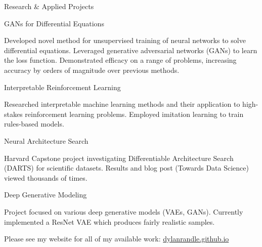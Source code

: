 \documentclass{resume} %
\begin{document}
\begin{rSection}{Research \& Applied Projects}

\begin{rSubsection}{GANs for Differential Equations}{}{}{}

\item Developed novel method for unsupervised training of neural networks to solve differential equations. Leveraged generative adversarial networks (GANs) to learn the loss function. Demonstrated efficacy on a range of problems, increasing accuracy by orders of magnitude over previous methods.

\end{rSubsection}

\begin{rSubsection}{Interpretable Reinforcement Learning}{}{}{}

\item Researched interpretable machine learning methods and their application to high-stakes reinforcement learning problems. Employed imitation learning to train rules-based models. 

\end{rSubsection}

\begin{rSubsection}{Neural Architecture Search}{}{}{}
\item Harvard Capstone project investigating Differentiable Architecture Search (DARTS) for scientific datasets. Results and blog post (Towards Data Science) viewed thousands of times.
\end{rSubsection}

\begin{rSubsection}{Deep Generative Modeling}{}{}{}
\item Project focused on various deep generative models (VAEs, GANs). Currently implemented a ResNet VAE which produces fairly realistic samples.
\end{rSubsection}

Please see my website for all of my available work: \url{dylanrandle.github.io}

\end{rSection}

\end{document}
